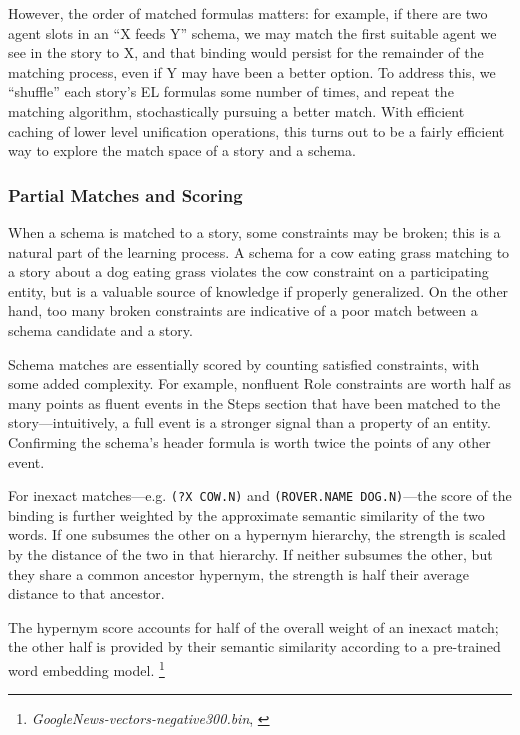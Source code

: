 However, the order of matched formulas matters: for example, if there are two agent slots in an ``X feeds Y'' schema, we may match the first suitable agent we see in the story to X, and that binding would persist for the remainder of the matching process, even if Y may have been a better option. To address this, we ``shuffle'' each story's EL formulas some number of times, and repeat the matching algorithm, stochastically pursuing a better match. With efficient caching of lower level unification operations, this turns out to be a fairly efficient way to explore the match space of a story and a schema.

\subsubsection{Partial Matches and Scoring}
\label{sec:scoring}

When a schema is matched to a story, some constraints may be broken; this is a natural part of the learning process. A schema for a cow eating grass matching to a story about a dog eating grass violates the cow constraint on a participating entity, but is a valuable source of knowledge if properly generalized. On the other hand, too many broken constraints are indicative of a poor match between a schema candidate and a story.

Schema matches are essentially scored by counting satisfied constraints, with some added complexity. For example, nonfluent Role constraints are worth half as many points as fluent events in the Steps section that have been matched to the story---intuitively, a full event is a stronger signal than a property of an entity. Confirming the schema's header formula is worth twice the points of any other event.

For inexact matches---e.g. \texttt{(?X COW.N)} and \texttt{(ROVER.NAME DOG.N)}---the score of the binding is further weighted by the approximate semantic similarity of the two words. If one subsumes the other on a hypernym hierarchy, the strength is scaled by the distance of the two in that hierarchy. If neither subsumes the other, but they share a common ancestor hypernym, the strength is half their average distance to that ancestor.

The hypernym score accounts for half of the overall weight of an inexact match; the other half is provided by their semantic similarity according to a pre-trained word embedding model. \footnote{\textit{GoogleNews-vectors-negative300.bin}, \citet{NIPS2013_5021}}


